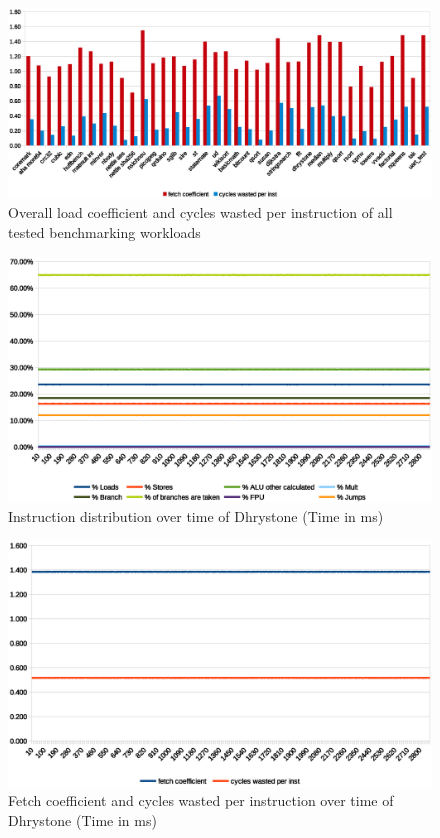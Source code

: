 \documentclass[../bachelor_paper.tex]{subfiles}
\begin{document}
\begin{figure}
    \centering
    \includegraphics[width=\textwidth]{img/graph/overall_fetch_waste.eps}
    \caption{Overall load coefficient and cycles wasted per instruction of all tested benchmarking workloads}
    \label{fig:res/overall/fetch_waste}
\end{figure}

\begin{figure}
    \centering
    \includegraphics[width=\textwidth]{img/graph/riscv/dhrystone_inst.eps}
    \caption{Instruction distribution over time of Dhrystone (Time in ms)}
    \label{fig:res/dhrystone/inst}
\end{figure}

\begin{figure}
    \centering
    \includegraphics[width=\textwidth]{img/graph/riscv/dhrystone_fetch_waste.eps}
    \caption{Fetch coefficient and cycles wasted per instruction over time of Dhrystone (Time in ms)}
    \label{fig:res/dhrystone/fetch_waste}
\end{figure}
\end{document}
